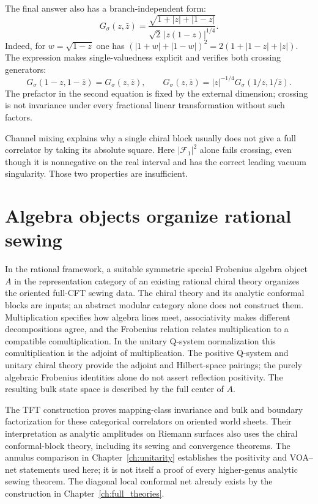 The final answer also has a branch-independent form:
\begin{equation}
 G_\sigma(z,\bar z)=
 \frac{\sqrt{1+|z|+|1-z|}}
      {\sqrt2\,|z(1-z)|^{1/4}}.
 \label{eq:sewing-Ising-singlevalued}
\end{equation}
Indeed, for $w=\sqrt{1-z}$ one has
$(|1+w|+|1-w|)^2=2(1+|1-z|+|z|)$.
The expression makes single-valuedness explicit and verifies
both crossing generators:
\[
 G_\sigma(1-z,1-\bar z)=G_\sigma(z,\bar z),\qquad
 G_\sigma(z,\bar z)=|z|^{-1/4}
             G_\sigma(1/z,1/\bar z).
\]
The prefactor in the second equation is fixed by the external
dimension; crossing is not invariance under every fractional
linear transformation without such factors.

Channel mixing explains why a single chiral block usually does not
give a full correlator by taking its absolute square. Here
$|\mathcal F_1|^2$ alone fails crossing, even though it is
nonnegative on the real interval and has the correct leading
vacuum singularity. Those two properties are insufficient.

\section{Algebra objects organize rational sewing}

In the rational framework, a suitable symmetric special Frobenius
algebra object $A$ in the representation category of an existing
rational chiral theory organizes the oriented full-CFT sewing
data. The chiral theory and its analytic conformal blocks are
inputs; an abstract modular category alone does not construct
them. Multiplication specifies how algebra lines meet,
associativity makes different decompositions agree, and the
Frobenius relation relates multiplication to a compatible
comultiplication. In the unitary Q-system normalization this
comultiplication is the adjoint of multiplication.
The positive Q-system and unitary chiral theory provide the adjoint
and Hilbert-space pairings; the purely algebraic Frobenius identities
alone do not assert reflection positivity. The resulting bulk state
space is described by the full center of $A$.

The TFT construction proves mapping-class invariance and bulk and
boundary factorization for these categorical correlators on oriented
world sheets. Their interpretation as analytic amplitudes on Riemann
surfaces also uses the chiral conformal-block theory, including its
sewing and convergence theorems. The annulus comparison in
Chapter~\ref{ch:unitarity} establishes the positivity and VOA--net
statements used here; it is not itself a proof of every higher-genus
analytic sewing theorem. The diagonal local conformal net already
exists by the construction in Chapter~\ref{ch:full_theories}.

